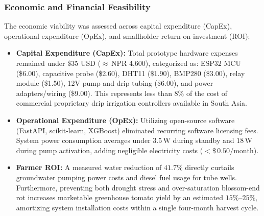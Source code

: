 \documentclass[12pt, a4paper]{article}
\begin{document}
\subsubsection{Economic and Financial Feasibility}
The economic viability was assessed across capital expenditure (CapEx), operational expenditure (OpEx), and smallholder return on investment (ROI):
\begin{itemize}[noitemsep]
    \item \textbf{Capital Expenditure (CapEx):} Total prototype hardware expenses remained under \$35 USD ($\approx$\,NPR 4,600), categorized as: ESP32 MCU (\$6.00), capacitive probe (\$2.60), DHT11 (\$1.90), BMP280 (\$3.00), relay module (\$1.50), 12V pump and drip tubing (\$6.00), and power adapters/wiring (\$9.00). This represents less than 8\% of the cost of commercial proprietary drip irrigation controllers available in South Asia.
    \item \textbf{Operational Expenditure (OpEx):} Utilizing open-source software (FastAPI, scikit-learn, XGBoost) eliminated recurring software licensing fees. System power consumption averages under $3.5\,\text{W}$ during standby and $18\,\text{W}$ during pump activation, adding negligible electricity costs ($<\$\,0.50/\text{month}$).
    \item \textbf{Farmer ROI:} A measured water reduction of $41.7\%$ directly curtails groundwater pumping power costs and diesel fuel usage for tube wells. Furthermore, preventing both drought stress and over-saturation blossom-end rot increases marketable greenhouse tomato yield by an estimated $15\%\text{--}25\%$, amortizing system installation costs within a single four-month harvest cycle.
\end{itemize}
\end{document}
